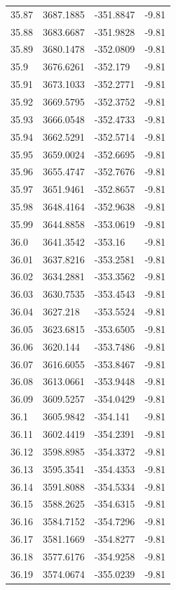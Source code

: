 \begin{table}[H]
\begin{tabular}{llll}
35.87 & 3687.1885 & -351.8847 & -9.81 \\
35.88 & 3683.6687 & -351.9828 & -9.81 \\
35.89 & 3680.1478 & -352.0809 & -9.81 \\
35.9 & 3676.6261 & -352.179 & -9.81 \\
35.91 & 3673.1033 & -352.2771 & -9.81 \\
35.92 & 3669.5795 & -352.3752 & -9.81 \\
35.93 & 3666.0548 & -352.4733 & -9.81 \\
35.94 & 3662.5291 & -352.5714 & -9.81 \\
35.95 & 3659.0024 & -352.6695 & -9.81 \\
35.96 & 3655.4747 & -352.7676 & -9.81 \\
35.97 & 3651.9461 & -352.8657 & -9.81 \\
35.98 & 3648.4164 & -352.9638 & -9.81 \\
35.99 & 3644.8858 & -353.0619 & -9.81 \\
36.0 & 3641.3542 & -353.16 & -9.81 \\
36.01 & 3637.8216 & -353.2581 & -9.81 \\
36.02 & 3634.2881 & -353.3562 & -9.81 \\
36.03 & 3630.7535 & -353.4543 & -9.81 \\
36.04 & 3627.218 & -353.5524 & -9.81 \\
36.05 & 3623.6815 & -353.6505 & -9.81 \\
36.06 & 3620.144 & -353.7486 & -9.81 \\
36.07 & 3616.6055 & -353.8467 & -9.81 \\
36.08 & 3613.0661 & -353.9448 & -9.81 \\
36.09 & 3609.5257 & -354.0429 & -9.81 \\
36.1 & 3605.9842 & -354.141 & -9.81 \\
36.11 & 3602.4419 & -354.2391 & -9.81 \\
36.12 & 3598.8985 & -354.3372 & -9.81 \\
36.13 & 3595.3541 & -354.4353 & -9.81 \\
36.14 & 3591.8088 & -354.5334 & -9.81 \\
36.15 & 3588.2625 & -354.6315 & -9.81 \\
36.16 & 3584.7152 & -354.7296 & -9.81 \\
36.17 & 3581.1669 & -354.8277 & -9.81 \\
36.18 & 3577.6176 & -354.9258 & -9.81 \\
36.19 & 3574.0674 & -355.0239 & -9.81 \\

\end{tabular}
\end{table}
